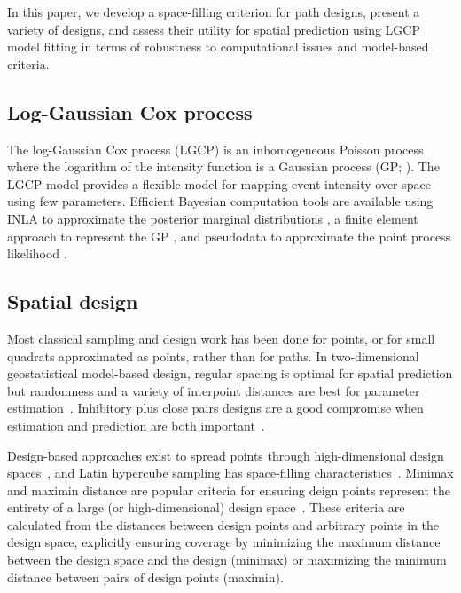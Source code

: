 \documentclass[review]{elsarticle}
\begin{document}
In this paper, we develop a space-filling criterion for path designs, present
a variety of designs, and assess their utility for spatial prediction using
LGCP model fitting in terms of robustness to computational issues and
model-based criteria.


\subsection{Log-Gaussian Cox process}

The log-Gaussian Cox process (LGCP) is an inhomogeneous Poisson process where
the logarithm of the intensity function is a Gaussian process (GP;
\citealt{moelleretal}). The LGCP model provides a flexible model for mapping event
intensity over space using few parameters. Efficient Bayesian computation tools
are available using INLA to approximate the posterior marginal distributions
\citep{rueetal}, a finite element approach to represent the GP
\citep{lindgrenetal}, and pseudodata to approximate the point process
likelihood \citep{simpsonetal}.


\subsection{Spatial design}

Most classical sampling and design work has been done for points, or for small
quadrats approximated as points, rather than for paths. In two-dimensional
geostatistical model-based design, regular spacing is optimal for spatial
prediction but randomness and a variety of interpoint distances are best for
parameter estimation~\citep{diggle}. Inhibitory plus close pairs designs are a
good compromise when estimation and prediction are both
important~\citep{chipetaetal2017}.

Design-based approaches exist to spread points through high-dimensional design
spaces~\citep{borkowskipiepel}, and Latin hypercube sampling has space-filling
characteristics~\citep{mckayetal,husslageetal}. Minimax and maximin distance
are popular criteria for ensuring deign points represent the entirety of a
large (or high-dimensional) design space~\citep{johnson}. These criteria
are calculated from the distances between design points and arbitrary
points in the design space, explicitly ensuring coverage by minimizing the
maximum distance between the design space and the design (minimax) or
maximizing the minimum distance between pairs of design points (maximin).
\end{document}
